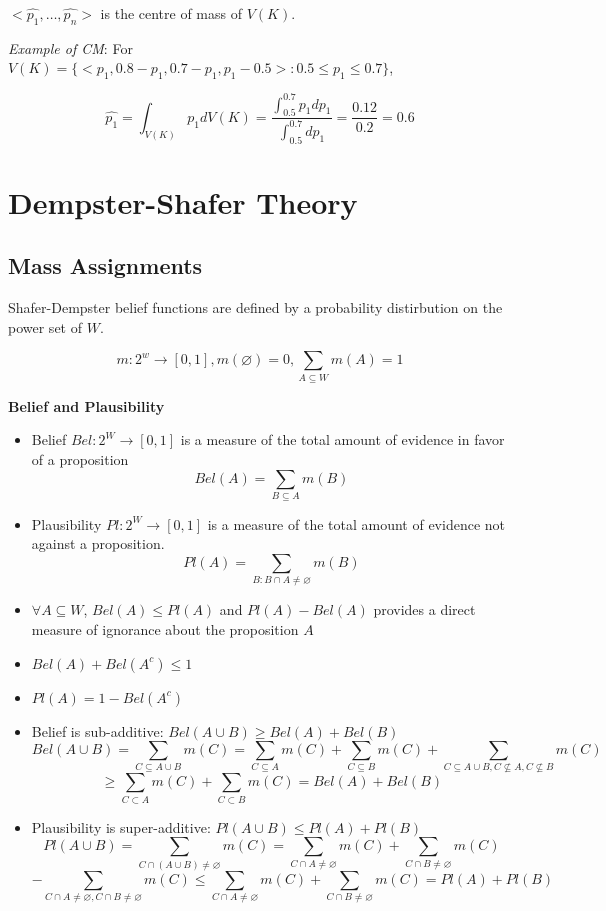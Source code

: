 \documentclass{article}
\begin{document}
$<\hat{p_1}, \dots, \hat{p_n}>$ is the centre of mass of $V(K)$.

\textit{Example of CM}: For $V(K) = \{<p_1, 0.8-p_1, 0.7-p_1, p_1-0.5>: 0.5 \leq p_1 \leq 0.7\}$, 

$$\hat{p_1} = \int_{V(K)}p_{1}dV(K) = \frac{\int_{0.5}^{0.7}p_{1}dp_1}{\int_{0.5}^{0.7}dp_1} = \frac{0.12}{0.2} = 0.6$$



\section{Dempster-Shafer Theory}

\subsection{Mass Assignments}

Shafer-Dempster belief functions are defined by a probability distirbution on the power set of $W$.

\begin{equation}
    m: 2^w \rightarrow [0, 1], m(\varnothing) = 0, \sum_{A \subseteq W}{ m(A) = 1}
\end{equation}

\textbf{Belief and Plausibility}

\begin{itemize}
    \item Belief $Bel: 2^W \rightarrow [0, 1]$ is a measure of the total amount of evidence in favor of a proposition
    \begin{equation}
        Bel(A) = \sum_{B \subseteq A}{m(B)}
    \end{equation}
    \item Plausibility $Pl: 2^W \rightarrow [0, 1]$ is a measure of the total amount of evidence not against a proposition.
    \begin{equation}
        Pl(A) = \sum_{B: B\cap A \neq \varnothing}m(B)
    \end{equation}
    \item $\forall A \subseteq W$, $Bel(A) \leq Pl(A)$ and $Pl(A) - Bel(A)$ provides a direct measure of ignorance about the proposition $A$
    \item $Bel(A) + Bel(A^c) \leq 1$
    \item $Pl(A) = 1 - Bel(A^c)$
    \item Belief is sub-additive: $Bel(A \cup B) \geq Bel(A) + Bel(B)$
    $$Bel(A \cup B) = \sum_{C \subseteq A \cup B}{m(C)} = \sum_{C \subseteq A }{m(C)} + \sum_{C \subseteq B}{m(C)} + \sum_{C \subseteq A \cup B, C \nsubseteq A, C \nsubseteq B}{m(C)}$$
    $$\geq \sum_{C \subset A}{m(C)} + \sum_{C \subset B}{m(C)} = Bel(A) + Bel(B)$$
    \item Plausibility is super-additive: $Pl(A \cup B) \leq Pl(A) + Pl(B)$
    $$Pl(A \cup B) = \sum_{C \cap (A \cup B) \neq \varnothing}m(C) = \sum_{C \cap A \neq \varnothing}m(C) + \sum_{C \cap B \neq \varnothing}m(C) $$
    $$- \sum_{C \cap A \neq \varnothing, C \cap B \neq \varnothing}m(C) \leq \sum_{C \cap A \neq \varnothing}m(C) + \sum_{C \cap B \neq \varnothing}m(C) = Pl(A) + Pl(B)$$
\end{itemize}
\end{document}
